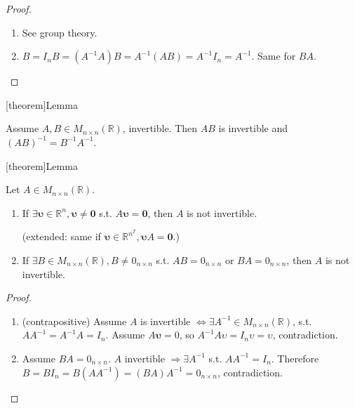 \documentclass[12pt]{report}
\theoremstyle{definition}
\begin{document}
\begin{proof}
    \,

    \begin{enumerate}[label = (\arabic*)]
        \item See group theory.
        \item $B = I_n B = (A^{-1} A)B = A^{-1} (AB) = A^{-1} I_n = A^{-1}$.
            Same for $BA$.
    \end{enumerate}
    
\end{proof}

[theorem]{Lemma}
\begin{AB = A-1 B-1}
    Assume $A,B \in M_{n \times n}(\mathbb{R})$, invertible.
    Then $AB$ is invertible and ${(AB)}^{-1} = B^{-1}A^{-1}$.
\end{AB = A-1 B-1}

[theorem]{Lemma}
\begin{invertibility}
    Let $A \in M_{n \times n}(\mathbb{R})$.
    \begin{enumerate}[label = (\arabic*)]
        \item If $\exists \pmb{\upsilon} \in \mathbb{R}^{n}, \pmb{\upsilon} \neq \pmb{0}$ 
            s.t. $A\pmb{\upsilon} = \pmb{0}$, then $A$ is not invertible.

            (extended: same if $\pmb{\upsilon} \in \mathbb{R}^{n}^{T}, \pmb{\upsilon}A = \pmb{0}$.)
        \item If $\exists B \in M_{n \times n}(\mathbb{R}), B \neq 0_{n \times n}$ s.t.
            $AB = 0_{n \times n}$ or $BA = 0_{n \times n}$, then $A$ is not invertible.
    \end{enumerate}
\end{invertibility}

\begin{proof}
    \,

    \begin{enumerate}[label = (\arabic*)]
        \item (contrapositive) Assume $A$ is invertible $\iff \exists A^{-1} \in M_{n\times n}(\mathbb{R})$,
            s.t. $AA^{-1} = A^{-1}A = I_n$.
            Assume $A\pmb{\upsilon} = 0$, so 
            $A^{-1}A\upsilon = I_n \upsilon = \upsilon$, contradiction.
        \item Assume $BA = 0_{n\times n}$. $A$ invertible $\Rightarrow{}\exists A^{-1}$
            s.t. $AA^{-1} = I_n$.
            Therefore $B = BI_{n} = B(AA^{-1}) = (BA)A^{-1} = 0_{n\times n}$, contradiction.
    \end{enumerate}
\end{proof}
\end{document}
